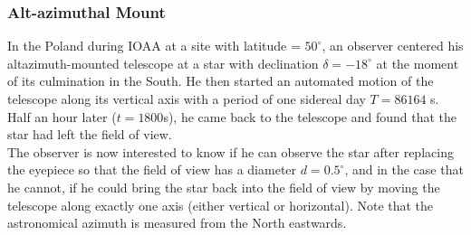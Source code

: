 \documentclass[a4paper,12pt]{extarticle}
\begin{document}

\subsubsection{Alt-azimuthal Mount}
In the Poland during IOAA at a site with latitude = $50^\circ$, an observer centered his altazimuth-mounted telescope at a star with declination $\delta = -18^\circ$ at the moment of its culmination in the South. He then started an automated motion of the telescope along its vertical axis with a period of one sidereal day $T= 86 164$ s. Half an hour later ($t = 1800$s), he came back to the telescope and found that the star had left the field of view.\\

The observer is now interested to know if he can observe the star after replacing the eyepiece so that the field of view has a diameter $d= 0.5^\circ$, and in the case that he cannot, if he could bring the star back into the field of view by moving the telescope along exactly one axis (either vertical or horizontal). Note that the astronomical azimuth is measured from the North eastwards.
\end{document}
